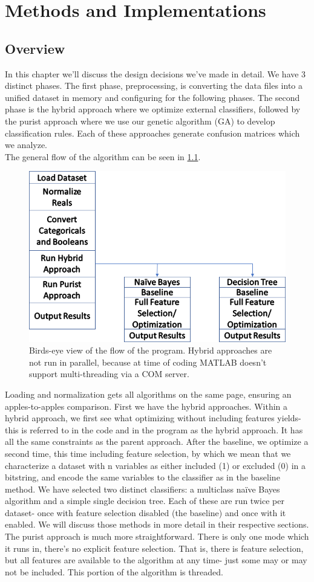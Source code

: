 \chapter{Methods and Implementations} \label{ch:Methods}
\section{Overview}
In this chapter we'll discuss the design decisions we've made in detail.  We have 3 distinct phases.  The first phase, preprocessing, is converting the data files into a unified dataset in memory and configuring for the following phases.  The second phase is the hybrid approach where we optimize external classifiers, followed by the purist approach where we use our genetic algorithm (GA) to develop classification rules.  Each of these approaches generate confusion matrices which we analyze.\\
The general flow of the algorithm can be seen in \ref{fig:ProgramFlow}.  \begin{figure}
	\centering
	\includegraphics[width=0.7\linewidth]{figures/png/ProgramFlow}
	\caption[Overall Program Flow]{Birds-eye view of the flow of the program. Hybrid approaches are not run in parallel, because at time of coding MATLAB doesn't support multi-threading via a COM server.}
	\label{fig:ProgramFlow}
\end{figure}
Loading and normalization gets all algorithms on the same page, ensuring an apples-to-apples comparison.  First we have the hybrid approaches.  Within a hybrid approach, we first see what optimizing without including features yields- this is referred to in the code and in the program as the hybrid approach.  It has all the same constraints as the parent approach.  After the baseline, we optimize a second time, this time including feature selection, by which we mean that we characterize a dataset with n variables as either included (1) or excluded (0) in a bitstring, and encode the same variables to the classifier as in the baseline method.  We have selected two distinct classifiers: a multiclass na\"ive Bayes algorithm and a simple single decision tree.  Each of these are run twice per dataset- once with feature selection disabled (the baseline) and once with it enabled.  We will discuss those methods in more detail in their respective sections.\\The purist approach is much more straightforward.  There is only one mode which it runs in, there's no explicit feature selection.  That is, there is feature selection, but all features are available to the algorithm at any time- just some may or may not be included. This portion of the algorithm is threaded.  
